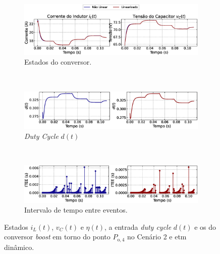 \begin{figure}[H]
  \centering
  \captionsetup{justification=centering}
  \begin{subfigure}{1.\textwidth}
    \centering
    \includegraphics[width=1.\textwidth]{figuras/dynamic-etm/boost/sim2/op2/result.eps}
    \caption{Estados do conversor.}
    \label{fig:boost_converter_variable_pcpl_dynamic_etm_op2_a}
  \end{subfigure}
  \\[6pt]
  \begin{subfigure}{1.\textwidth}
    \centering
    \includegraphics[width=1.\textwidth]{figuras/dynamic-etm/boost/sim2/op2/duty-cycle.eps}
    \caption{\textit{Duty Cycle} $d(t)$}
    \label{fig:boost_converter_variable_pcpl_dynamic_etm_op2_b}
  \end{subfigure}
  \\[6pt]
  \begin{subfigure}{1.\textwidth}
    \centering
    \includegraphics[width=1.\textwidth]{figuras/dynamic-etm/boost/sim2/op2/inter-event-times.eps}
    \caption{Intervalo de tempo entre eventos.}
    \label{fig:boost_converter_variable_pcpl_dynamic_etm_op2_c}
  \end{subfigure}
  \caption{Estados $i_L(t)$, $v_C(t)$ e $\eta(t)$, a entrada \textit{duty cycle} $d(t)$ e os  do conversor \textit{boost }em torno do ponto $P_{\mathrm{o}, 4}$ no Cenário 2 e \acrshort{etm} dinâmico.}
  \label{fig:boost_converter_variable_pcpl_dynamic_etm_op2}
\end{figure}

